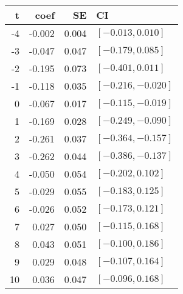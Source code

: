 
\begin{tabular}[t]{rrrl}
\toprule
t & coef & SE & CI\\
\midrule
-4 & -0.002 & 0.004 & $[-0.013 , 0.010]$\\
-3 & -0.047 & 0.047 & $[-0.179 , 0.085]$\\
-2 & -0.195 & 0.073 & $[-0.401 , 0.011]$\\
-1 & -0.118 & 0.035 & $[-0.216 , -0.020]$\\
0 & -0.067 & 0.017 & $[-0.115 , -0.019]$\\
1 & -0.169 & 0.028 & $[-0.249 , -0.090]$\\
2 & -0.261 & 0.037 & $[-0.364 , -0.157]$\\
3 & -0.262 & 0.044 & $[-0.386 , -0.137]$\\
4 & -0.050 & 0.054 & $[-0.202 , 0.102]$\\
5 & -0.029 & 0.055 & $[-0.183 , 0.125]$\\
6 & -0.026 & 0.052 & $[-0.173 , 0.121]$\\
7 & 0.027 & 0.050 & $[-0.115 , 0.168]$\\
8 & 0.043 & 0.051 & $[-0.100 , 0.186]$\\
9 & 0.029 & 0.048 & $[-0.107 , 0.164]$\\
10 & 0.036 & 0.047 & $[-0.096 , 0.168]$\\
\bottomrule
\end{tabular}
